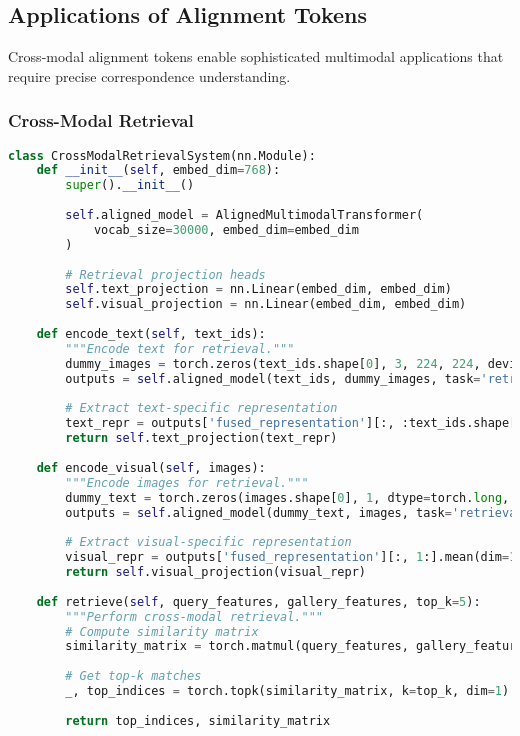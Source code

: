 \subsection{Applications of Alignment Tokens}

Cross-modal alignment tokens enable sophisticated multimodal applications that require precise correspondence understanding.

\subsubsection{Cross-Modal Retrieval}

\begin{lstlisting}[language=Python, caption=Cross-modal retrieval with alignment tokens]
class CrossModalRetrievalSystem(nn.Module):
    def __init__(self, embed_dim=768):
        super().__init__()
        
        self.aligned_model = AlignedMultimodalTransformer(
            vocab_size=30000, embed_dim=embed_dim
        )
        
        # Retrieval projection heads
        self.text_projection = nn.Linear(embed_dim, embed_dim)
        self.visual_projection = nn.Linear(embed_dim, embed_dim)
        
    def encode_text(self, text_ids):
        """Encode text for retrieval."""
        dummy_images = torch.zeros(text_ids.shape[0], 3, 224, 224, device=text_ids.device)
        outputs = self.aligned_model(text_ids, dummy_images, task='retrieval')
        
        # Extract text-specific representation
        text_repr = outputs['fused_representation'][:, :text_ids.shape[1]].mean(dim=1)
        return self.text_projection(text_repr)
    
    def encode_visual(self, images):
        """Encode images for retrieval."""
        dummy_text = torch.zeros(images.shape[0], 1, dtype=torch.long, device=images.device)
        outputs = self.aligned_model(dummy_text, images, task='retrieval')
        
        # Extract visual-specific representation
        visual_repr = outputs['fused_representation'][:, 1:].mean(dim=1)  # Skip text token
        return self.visual_projection(visual_repr)
    
    def retrieve(self, query_features, gallery_features, top_k=5):
        """Perform cross-modal retrieval."""
        # Compute similarity matrix
        similarity_matrix = torch.matmul(query_features, gallery_features.t())
        
        # Get top-k matches
        _, top_indices = torch.topk(similarity_matrix, k=top_k, dim=1)
        
        return top_indices, similarity_matrix
\end{lstlisting}

